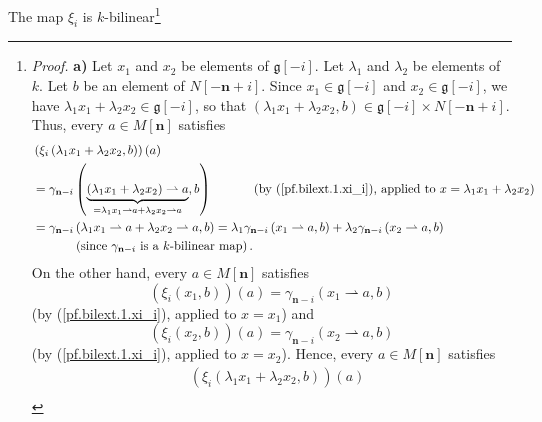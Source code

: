 \documentclass[etingof-lie.tex]{subfiles}
\begin{document}
\begin{noncompile}
The map $\xi_{i}$ is $k$-bilinear\footnote{\textit{Proof.} \textbf{a)} Let
$x_{1}$ and $x_{2}$ be elements of $\mathfrak{g}\left[  -i\right]  $. Let
$\lambda_{1}$ and $\lambda_{2}$ be elements of $k$. Let $b$ be an element of
$N\left[  -\mathbf{n}+i\right]  $. Since $x_{1}\in\mathfrak{g}\left[
-i\right]  $ and $x_{2}\in\mathfrak{g}\left[  -i\right]  $, we have
$\lambda_{1}x_{1}+\lambda_{2}x_{2}\in\mathfrak{g}\left[  -i\right]  $, so that
$\left(  \lambda_{1}x_{1}+\lambda_{2}x_{2},b\right)  \in\mathfrak{g}\left[
-i\right]  \times N\left[  -\mathbf{n}+i\right]  $. Thus, every $a\in M\left[
\mathbf{n}\right]  $ satisfies%
\begin{align}
&  \left(  \xi_{i}\left(  \lambda_{1}x_{1}+\lambda_{2}x_{2},b\right)  \right)
\left(  a\right) \nonumber\\
&  =\gamma_{\mathbf{n}-i}\left(  \underbrace{\left(  \lambda_{1}x_{1}%
+\lambda_{2}x_{2}\right)  \rightharpoonup a}_{=\lambda_{1}x_{1}\rightharpoonup
a+\lambda_{2}x_{2}\rightharpoonup a},b\right)  \ \ \ \ \ \ \ \ \ \ \left(
\text{by (\ref{pf.bilext.1.xi_i}), applied to }x=\lambda_{1}x_{1}+\lambda
_{2}x_{2}\right) \nonumber\\
&  =\gamma_{\mathbf{n}-i}\left(  \lambda_{1}x_{1}\rightharpoonup a+\lambda
_{2}x_{2}\rightharpoonup a,b\right)  =\lambda_{1}\gamma_{\mathbf{n}-i}\left(
x_{1}\rightharpoonup a,b\right)  +\lambda_{2}\gamma_{\mathbf{n}-i}\left(
x_{2}\rightharpoonup a,b\right) \label{pf.bilext.1.1}\\
&  \ \ \ \ \ \ \ \ \ \ \left(  \text{since }\gamma_{\mathbf{n}-i}\text{ is a
}k\text{-bilinear map}\right)  .\nonumber
\end{align}
On the other hand, every $a\in M\left[  \mathbf{n}\right]  $ satisfies
\begin{equation}
\left(  \xi_{i}\left(  x_{1},b\right)  \right)  \left(  a\right)
=\gamma_{\mathbf{n}-i}\left(  x_{1}\rightharpoonup a,b\right)
\label{pf.bilext.1.1b}%
\end{equation}
(by (\ref{pf.bilext.1.xi_i}), applied to $x=x_{1}$) and
\begin{equation}
\left(  \xi_{i}\left(  x_{2},b\right)  \right)  \left(  a\right)
=\gamma_{\mathbf{n}-i}\left(  x_{2}\rightharpoonup a,b\right)
\label{pf.bilext.1.1c}%
\end{equation}
(by (\ref{pf.bilext.1.xi_i}), applied to $x=x_{2}$). Hence, every $a\in
M\left[  \mathbf{n}\right]  $ satisfies
\begin{align*}
&  \left(  \xi_{i}\left(  \lambda_{1}x_{1}+\lambda_{2}x_{2},b\right)  \right)
\left(  a\right) \\

\end{align*}}
\end{noncompile}
\end{document}
